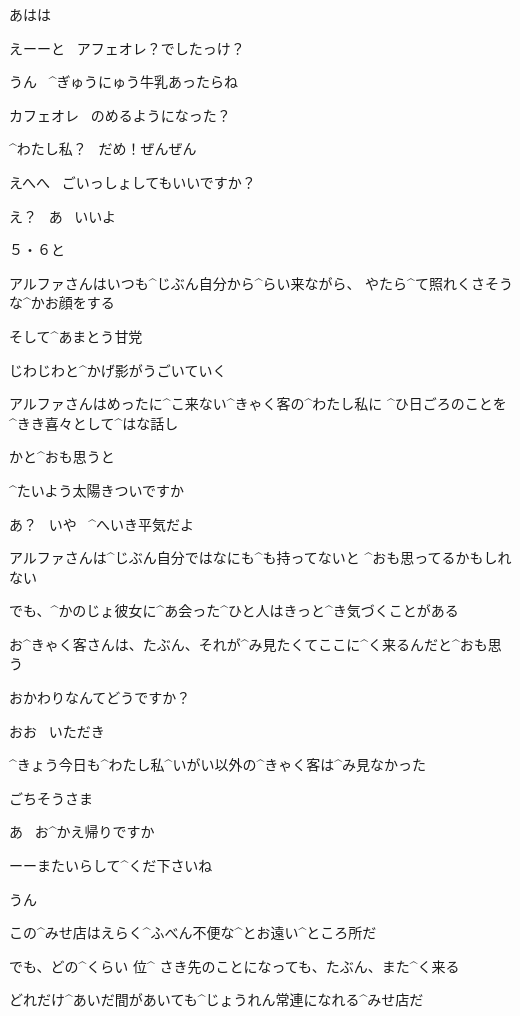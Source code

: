 \Alpha あはは

\page
\Alpha えーーと
\ アフェオレ？でしたっけ？

\Alpha うん
\ ^{ぎゅうにゅう}{牛乳}あったらね

\Narrator カフェオレ
\ のめるようになった？

\Alpha ^{わたし}{私}？
\ だめ！ぜんぜん

\page
\Alpha えへへ
\ ごいっしょしてもいいですか？

\Narrator え？
\ あ
\ いいよ

\Alpha ５・６と

\Narrator アルファさんはいつも^{じぶん}{自分}から^{らい}{来}ながら、
やたら^{て}{照}れくさそうな^{かお}{顔}をする

\Narrator そして^{あまとう}{甘党}

\page
\Narrator じわじわと^{かげ}{影}がうごいていく

\Narrator アルファさんはめったに^{こ}{来}ない^{きゃく}{客}の^{わたし}{私}に
^{ひ}{日}ごろのことを^{きき}{喜々}として^{はな}{話}し

\page
\Narrator かと^{おも}{思}うと

\Alpha ^{たいよう}{太陽}きついですか

\Narrator あ？
\ いや
\ ^{へいき}{平気}だよ

\page
\Narrator アルファさんは^{じぶん}{自分}ではなにも^{も}{持}ってないと
^{おも}{思}ってるかもしれない

\Narrator でも、^{かのじょ}{彼女}に^{あ}{会}った^{ひと}{人}はきっと^{き}{気}づくことがある

\Narrator お^{きゃく}{客}さんは、たぶん、それが^{み}{見}たくてここに^{く}{来}るんだと^{おも}{思}う

\page
\Alpha おかわりなんてどうですか？

\Narrator おお
\ いただき

\Narrator ^{きょう}{今日}も^{わたし}{私}^{いがい}{以外}の^{きゃく}{客}は^{み}{見}なかった

\page
\Narrator ごちそうさま

\Alpha あ
\ お^{かえ}{帰}りですか

\Alpha ーーまたいらして^{くだ}{下}さいね

\Narrator うん

\page
\Narrator この^{みせ}{店}はえらく^{ふべん}{不便}な^{とお}{遠}い^{ところ}{所}だ

\Narrator でも、どの^{くらい }{位}^{ さき}{先}のことになっても、たぶん、また^{く}{来}る

\page
\Narrator どれだけ^{あいだ}{間}があいても^{じょうれん}{常連}になれる^{みせ}{店}だ


